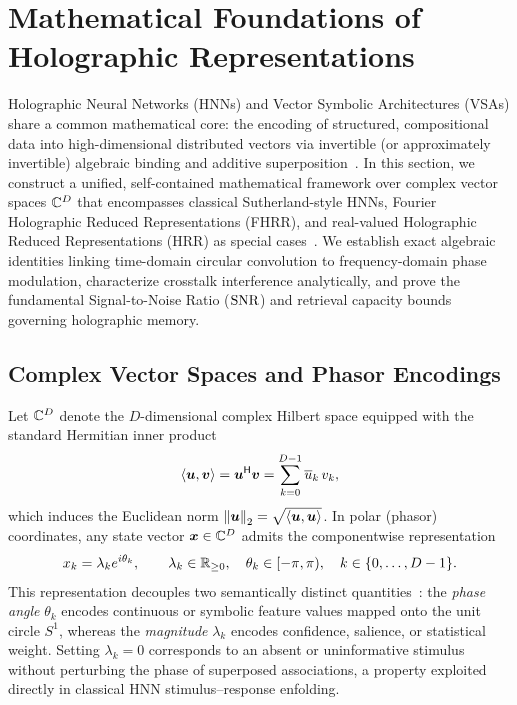 \section{Mathematical Foundations of Holographic Representations}\label{sec:math}

Holographic Neural Networks (HNNs) and Vector Symbolic Architectures (VSAs) share a common mathematical core: the encoding of structured, compositional data into high-dimensional distributed vectors via invertible (or approximately invertible) algebraic binding and additive superposition~\cite{SUTHERLAND_1990_HNN,PLATE_1995_HRR,KANERVA_2009_HDC}.
In this section, we construct a unified, self-contained mathematical framework over complex vector spaces $\mathbb{C}^D$ that encompasses classical Sutherland-style HNNs, Fourier Holographic Reduced Representations (FHRR), and real-valued Holographic Reduced Representations (HRR) as special cases~\cite{SCHLEGEL_VSA_COMPARISON,KLEYKO_VSA_SURVEY}.
We establish exact algebraic identities linking time-domain circular convolution to frequency-domain phase modulation, characterize crosstalk interference analytically, and prove the fundamental Signal-to-Noise Ratio ($\mathrm{SNR}$) and retrieval capacity bounds governing holographic memory.

\subsection{Complex Vector Spaces and Phasor Encodings}\label{sec:math:phasors}

Let $\mathbb{C}^D$ denote the $D$-dimensional complex Hilbert space equipped with the standard Hermitian inner product
\begin{equation}\label{eq:hermitian_inner}
    \left\langle \boldsymbol{u}, \boldsymbol{v} \right\rangle = \boldsymbol{u}^{\mathsf{H}} \boldsymbol{v} = \sum_{k=0}^{D-1} \overline{u}_k \, v_k,
\end{equation}
which induces the Euclidean norm $\left\lVert \boldsymbol{u} \right\rVert_2 = \sqrt{\left\langle \boldsymbol{u}, \boldsymbol{u} \right\rangle}$.
In polar (phasor) coordinates, any state vector $\boldsymbol{x} \in \mathbb{C}^D$ admits the componentwise representation
\begin{equation}\label{eq:phasor_form}
    x_k = \lambda_k e^{i \theta_k}, \qquad \lambda_k \in \mathbb{R}_{\ge 0}, \quad \theta_k \in [-\pi, \pi), \quad k \in \{0, \dots, D-1\}.
\end{equation}
This representation decouples two semantically distinct quantities~\cite{SUTHERLAND_1990_HNN}: the \emph{phase angle} $\theta_k$ encodes continuous or symbolic feature values mapped onto the unit circle $S^1$, whereas the \emph{magnitude} $\lambda_k$ encodes confidence, salience, or statistical weight.
Setting $\lambda_k = 0$ corresponds to an absent or uninformative stimulus without perturbing the phase of superposed associations, a property exploited directly in classical HNN stimulus--response enfolding.

